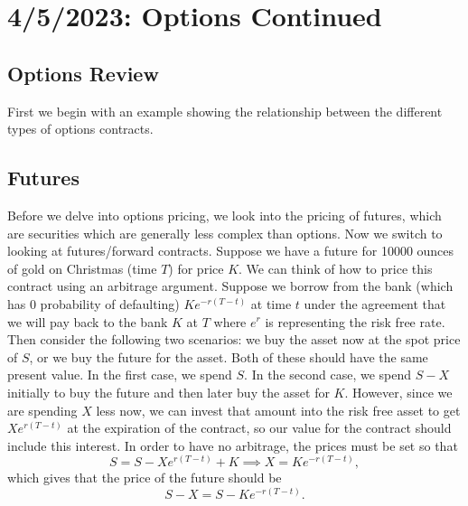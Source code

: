 \chapter{4/5/2023: Options Continued}
\section{Options Review}
First we begin with an example showing the relationship between the different types of options contracts.

\section{Futures}
Before we delve into options pricing, we look into the pricing of futures, which are securities which are generally less complex than options. Now we switch to looking at futures/forward contracts.
Suppose we have a future for 10000 ounces of gold on Christmas (time $T$) for price $K$. We can think of how to price this contract using an arbitrage argument. Suppose we borrow from the bank (which has 0 probability of defaulting) $Ke^{-r(T-t)}$ at time $t$ under the agreement that we will pay back to the bank $K$ at $T$ where $e^r$ is representing the risk free rate. Then consider the following two scenarios: we buy the asset now at the spot price of $S$, or we buy the future for the asset. Both of these should have the same present value. In the first case, we spend $S$. In the second case, we spend $S-X$ initially to buy the future and then later buy the asset for $K$. However, since we are spending $X$ less now, we can invest that amount into the risk free asset to get $Xe^{r(T-t)}$ at the expiration of the contract, so our value for the contract should include this interest. In order to have no arbitrage, the prices must be set so that $$ S = S - Xe^{r(T-t)} + K \implies X = Ke^{-r(T-t)}, $$ which gives that the price of the future should be $$ S - X = S - Ke^{-r(T-t)}. $$ 

